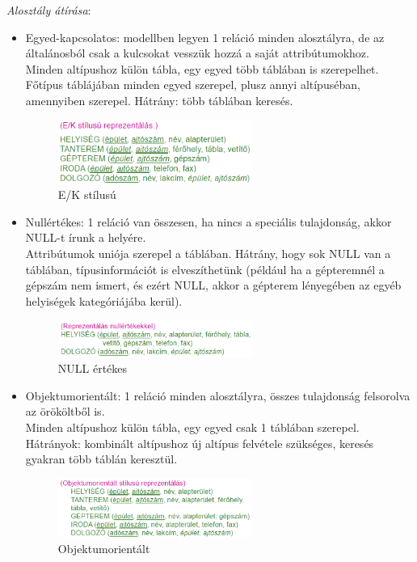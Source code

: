 \documentclass[margin=0px]{article}
\begin{document}
\textit{Alosztály átírása}:
\begin{itemize}
    \item Egyed-kapcsolatos: modellben legyen 1 reláció minden alosztályra, de az általánosból csak a kulcsokat vesszük hozzá a saját attribútumokhoz.\\
          Minden altípushoz külön tábla, egy egyed több táblában is szerepelhet. Főtípus táblájában minden egyed szerepel, plusz annyi altípuséban, amennyiben szerepel. Hátrány: több táblában keresés.
          \begin{figure}[H]
              \centering
              \includegraphics[width=0.6\textwidth]{img/ek.png}
              \caption{E/K stílusú}
          \end{figure}
    \item Nullértékes: 1 reláció van összesen, ha nincs a speciális tulajdonság, akkor NULL-t írunk a helyére.\\
          Attribútumok uniója szerepel a táblában. Hátrány, hogy sok NULL van a táblában, típusinformációt is elveszíthetünk (például ha a gépteremnél a gépszám nem ismert, és ezért NULL, akkor a gépterem lényegében az egyéb helyiségek kategóriájába kerül).
          \begin{figure}[H]
              \centering
              \includegraphics[width=0.6\textwidth]{img/null.png}
              \caption{NULL értékes}
          \end{figure}
    \item Objektumorientált: 1 reláció minden alosztályra, összes tulajdonság felsorolva az örököltből is. \\
          Minden altípushoz külön tábla, egy egyed csak 1 táblában szerepel. Hátrányok: kombinált altípushoz új altípus felvétele szükséges, keresés gyakran több táblán keresztül.
          \begin{figure}[H]
              \centering
              \includegraphics[width=0.6\textwidth]{img/oo.png}
              \caption{Objektumorientált}
          \end{figure}
\end{itemize}
\end{document}
